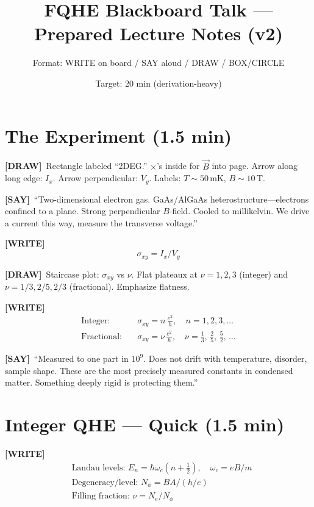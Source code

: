 \documentclass[11pt]{article}
\title{\textbf{FQHE Blackboard Talk --- Prepared Lecture Notes (v2)}}
\author{Format: \textcolor{writecol}{WRITE on board} / \textcolor{saycol}{SAY aloud} / \textcolor{drawcol}{DRAW} / \textcolor{boxcol}{BOX/CIRCLE}}
\date{Target: 20 min (derivation-heavy)}
\newcommand{\WRITE}{\textcolor{writecol}{\textbf{[WRITE]}}}
\newcommand{\SAY}{\textcolor{saycol}{\textbf{[SAY]}}}
\newcommand{\DRAW}{\textcolor{drawcol}{\textbf{[DRAW]}}}
\begin{document}
\maketitle
\thispagestyle{empty}

\section{The Experiment (1.5 min)}

\DRAW\ Rectangle labeled ``2DEG.'' $\times$'s inside for $\vec B$ into page. Arrow along long edge: $I_x$. Arrow perpendicular: $V_y$. Labels: $T\sim50\,$mK, $B\sim10\,$T.

\SAY\ ``Two-dimensional electron gas. GaAs/AlGaAs heterostructure---electrons confined to a plane. Strong perpendicular $B$-field. Cooled to millikelvin. We drive a current this way, measure the transverse voltage.''

\WRITE
\begin{equation*}
\sigma_{xy} = I_x / V_y
\end{equation*}

\DRAW\ Staircase plot: $\sigma_{xy}$ vs $\nu$. Flat plateaux at $\nu = 1, 2, 3$ (integer) and $\nu = 1/3, 2/5, 2/3$ (fractional). Emphasize flatness.

\WRITE
\begin{align*}
\text{Integer:}\quad & \sigma_{xy} = n\,\frac{e^2}{h}, \quad n=1,2,3,\ldots \\[3pt]
\text{Fractional:}\quad & \sigma_{xy} = \nu\,\frac{e^2}{h}, \quad \nu = \tfrac{1}{3},\,\tfrac{2}{5},\,\tfrac{5}{2},\,\ldots
\end{align*}

\SAY\ ``Measured to one part in $10^{9}$. Does not drift with temperature, disorder, sample shape. These are the most precisely measured constants in condensed matter. Something deeply rigid is protecting them.''

\section{Integer QHE --- Quick (1.5 min)}

\WRITE
\begin{align*}
&\text{Landau levels: } E_n = \hbar\omega_c(n+\tfrac{1}{2}), \quad \omega_c = eB/m\\[4pt]
&\text{Degeneracy/level: } N_\phi = BA/(h/e)\\[4pt]
&\text{Filling fraction: } \nu = N_e / N_\phi
\end{align*}
\end{document}
